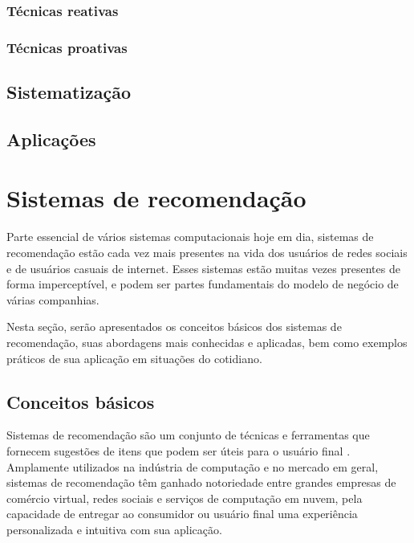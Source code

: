 \documentclass[
	12pt,				%
	a4paper,			%
	english,			%
	french,				%
	spanish,			%
	brazil				%
	]{abntex2}
\begin{document}
\subsubsection{Técnicas reativas}

\subsubsection{Técnicas proativas}

\subsection{Sistematização}

\subsection{Aplicações}




\section{Sistemas de recomendação}\label{sec_recom}

Parte essencial de vários sistemas computacionais hoje em dia, sistemas de recomendação estão cada vez mais presentes na vida dos usuários de redes sociais e de usuários casuais de internet. Esses sistemas estão muitas vezes presentes de forma imperceptível, e podem ser partes fundamentais do modelo de negócio de várias companhias.

Nesta seção, serão apresentados os conceitos básicos dos sistemas de recomendação, suas abordagens mais conhecidas e aplicadas, bem como exemplos práticos de sua aplicação em situações do cotidiano.

\subsection{Conceitos básicos}

Sistemas de recomendação são um conjunto de técnicas e ferramentas que fornecem sugestões de itens que podem ser úteis para o usuário final \cite{resnick1997recommender, good1999combining, burke2007hybrid}. Amplamente utilizados na indústria de computação e no mercado em geral, sistemas de recomendação têm ganhado notoriedade entre grandes empresas de comércio virtual, redes sociais e serviços de computação em nuvem, pela capacidade de entregar ao consumidor ou usuário final uma experiência personalizada e intuitiva com sua aplicação.
\end{document}

